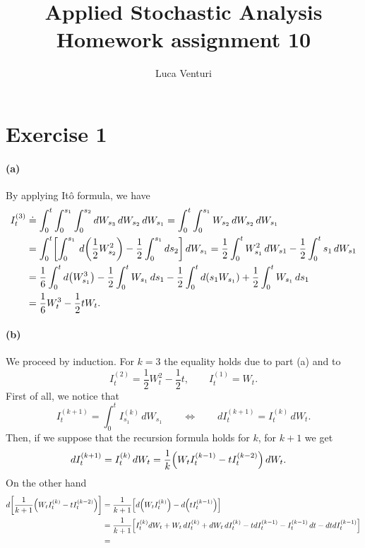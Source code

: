 \documentclass[a4paper,11pt]{article}
\theoremstyle{definition}
\theoremstyle{plain}
\theoremstyle{remark}
\DeclarePairedDelimiter{\parr}{(}{)}
\DeclarePairedDelimiter{\parq}{[}{]}
\begin{document}
\title{Applied Stochastic Analysis \\ Homework assignment 10}
\author{Luca Venturi}
\maketitle

\section*{Exercise 1}

\paragraph*{(a)}

By applying It\^o formula, we have
\begin{align*}
I^{(3)}_t & \doteq \int_0^t\int_0^{s_1}\int_0^{s_2} dW_{s_3}\,dW_{s_2}\,dW_{s_1} = \int_0^t\int_0^{s_1}W_{s_2}\,dW_{s_2}\,dW_{s_1} \\
& = \int_0^t\parq*{\int_0^{s_1}\,d\parr*{\frac{1}{2}W_{s_2}^2} - \frac{1}{2}\int_0^{s_1}ds_2}\,dW_{s_1} = \frac{1}{2}\int_0^t W_{s_1}^2\,dW_{s1} - \frac{1}{2}\int_0^t s_1\,dW_{s1} \\ & = \frac{1}{6}\int_0^td\parr*{W_{s_1}^3} - \frac{1}{2}\int_0^tW_{s_1}\,ds_1 - \frac{1}{2}\int_0^td(s_1W_{s_1}) + \frac{1}{2}\int_0^t W_{s_1}\,ds_1 \\ & = \frac{1}{6}W_t^3 -\frac{1}{2}tW_t .
\end{align*}

\paragraph*{(b)}

We proceed by induction. For $k=3$ the equality holds due to part (a) and to 
$$
I^{(2)}_t = \frac{1}{2}W_t^2-\frac{1}{2}t,\qquad I^{(1)}_t = W_t.
$$
First of all, we notice that
$$
I_t^{(k+1)} = \int_0^tI_{s_1}^{(k)}\,dW_{s_1} \qquad\Longleftrightarrow\qquad dI_t^{(k+1)} = I_t^{(k)}\,dW_t.
$$
Then, if we suppose that the recursion formula holds for $k$, for $k+1$ we get
\begin{align*}
dI_t^{(k+1)} & = I_t^{(k)}\,dW_t = \frac{1}{k}\parr*{W_tI_t^{(k-1)}-tI_t^{(k-2)}}\,dW_t. 
\end{align*}
On the other hand
\begin{align*}
d\parq*{\frac{1}{k+1}\parr*{W_tI_t^{(k)}-tI_t^{(k-2)}}} & = \frac{1}{k+1}\parq*{d\parr*{W_tI_t^{(k)}}-d\parr*{tI_t^{(k-1)}}} \\ & = \frac{1}{k+1}\parq*{I_t^{(k)}dW_t+W_t\,dI_t^{(k)}+dW_t\,dI_t^{(k)}-tdI_t^{(k-1)}-I_t^{(k-1)}\,dt -dtdI_t^{(k-1)}} \\ & = 
\end{align*}
\end{document}
